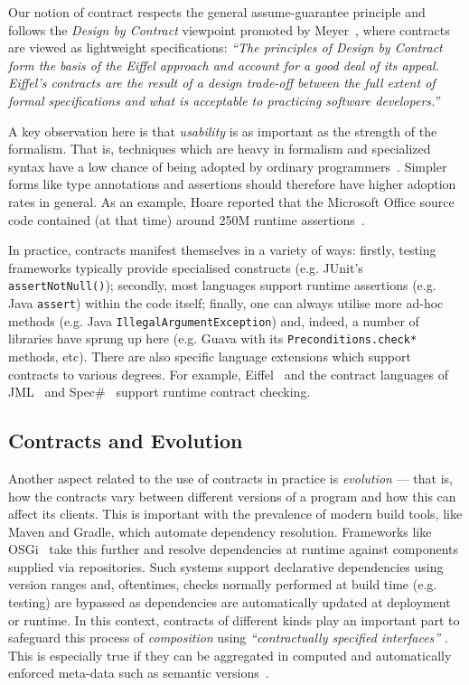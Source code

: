 \documentclass[a4paper,UKenglish]{lipics-v2016}
\begin{document}
Our notion of contract respects the general assume-guarantee principle and follows the {\em Design by Contract} viewpoint promoted by Meyer~\cite{meyer1992applying}, where contracts are viewed as lightweight specifications:
\textit{``The principles of Design by Contract form the basis of the Eiffel approach and account for a good deal of its appeal. Eiffel's contracts are the result of a design trade-off between the full extent of formal specifications and what is acceptable to practicing software developers.''}

A key observation here is that {\em usability} is as important as the strength of the formalism.  That is, techniques which are heavy in formalism and specialized syntax have a low chance of being adopted by ordinary programmers~\cite{meyer1992applying}.  Simpler forms like type annotations and assertions should therefore have higher adoption rates in general.  As an example, Hoare reported that the Microsoft Office source code contained (at that time) around 250M runtime assertions~\cite{Hoare03b}.

In practice, contracts manifest themselves in a variety of ways: firstly, testing frameworks typically provide specialised constructs (e.g. JUnit's \texttt{assertNotNull()});  secondly, most languages support runtime assertions (e.g. Java \texttt{assert}) within the code itself; finally, one can always utilise more ad-hoc methods (e.g. Java \texttt{IllegalArgumentException}) and, indeed, a number of libraries have sprung up here (e.g. Guava with its \texttt{Preconditions.check*} methods, etc).  There are also specific language extensions which support contracts to various degrees.  For example, Eiffel~\cite{Meyer88} and the contract languages of JML~\cite{LCCRC05} and Spec\#~\cite{BFLMSV11} support runtime contract checking.

\subsection{Contracts and Evolution}

Another aspect related to the use of contracts in practice is {\em evolution} --- that is, how the contracts vary between different versions of a program and how this can affect its clients.  This is important with the prevalence of modern build tools, like Maven and Gradle, which automate dependency resolution. Frameworks like OSGi~\cite{OSGi} take this further and resolve dependencies at runtime against components supplied via repositories.   Such systems support declarative dependencies using version ranges and, oftentimes, checks normally performed at build time (e.g. testing) are bypassed as dependencies are automatically updated at deployment or runtime. In this context, contracts of different kinds \cite{beugnard99making} play an important part to safeguard this process of \textit{composition} using \textit{``contractually specified interfaces''} \cite{szyperski02component}.  This is especially true if they can be aggregated in computed and automatically enforced meta-data such as semantic versions~\cite{semver}. 
\end{document}
